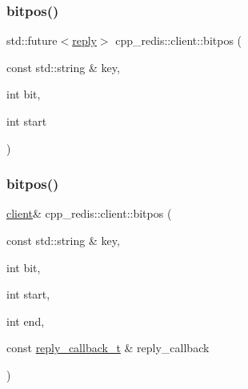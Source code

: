 \mbox{\label{classcpp__redis_1_1client_aa0ae004e45eb37ffed4d8c9f5ea35b4c}} 
\subsubsection{\texorpdfstring{bitpos()}{bitpos()}\hspace{0.1cm}{\footnotesize\ttfamily [4/6]}}
{\footnotesize\ttfamily std\+::future$<$\hyperlink{classcpp__redis_1_1reply}{reply}$>$ cpp\+\_\+redis\+::client\+::bitpos (\begin{DoxyParamCaption}\item[{const std\+::string \&}]{key,  }\item[{int}]{bit,  }\item[{int}]{start }\end{DoxyParamCaption})}

\mbox{\label{classcpp__redis_1_1client_a3655449a666a9111d3dce7e61932ab1b}} 
\subsubsection{\texorpdfstring{bitpos()}{bitpos()}\hspace{0.1cm}{\footnotesize\ttfamily [5/6]}}
{\footnotesize\ttfamily \hyperlink{classcpp__redis_1_1client}{client}\& cpp\+\_\+redis\+::client\+::bitpos (\begin{DoxyParamCaption}\item[{const std\+::string \&}]{key,  }\item[{int}]{bit,  }\item[{int}]{start,  }\item[{int}]{end,  }\item[{const \hyperlink{classcpp__redis_1_1client_a061a1140d36d2eaeda82b09a0bb3f9f2}{reply\+\_\+callback\+\_\+t} \&}]{reply\+\_\+callback }\end{DoxyParamCaption})}

\mbox{\label{classcpp__redis_1_1client_a43b5121105276ccae731bb6093c80e02}} 
